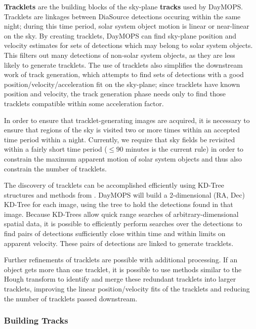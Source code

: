 \documentclass[12pt,preprint]{aastex}
\begin{document}
\textbf{Tracklets} are the building blocks of the sky-plane
\textbf{tracks} used by DayMOPS.  Tracklets are linkages between
DiaSource detections occuring within the same night; during this time
period, solar system object motion is linear or near-linear on the
sky. By creating tracklets, DayMOPS can find sky-plane position and
velocity estimates for sets of detections which may belong to solar
system objects.  This filters out many detections of non-solar system
objects, as they are less likely to generate tracklets.  The use of
tracklets also simplifies the downstream work of track generation,
which attempts to find sets of detections with a good
position/velocity/acceleration fit on the sky-plane; since tracklets
have known position and velocity, the track generation phase needs
only to find those tracklets compatible within some acceleration
factor.

In order to ensure that tracklet-generating images are acquired, it is
necessary to ensure that regions of the sky is visited two or more
times within an accepted time period within a night.  Currently, we
require that sky fields be revisited within a fairly short time period
($\leq 90$ minutes is the current rule) in order to constrain the
maximum apparent motion of solar system objects and thus also
constrain the number of tracklets.

The discovery of tracklets can be accomplished efficiently using
KD-Tree structures \citep{bentley_kdtrees} and methods from
\citet{kubica_thesis}.  DayMOPS will build a 2-dimensional (RA, Dec)
KD-Tree for each image, using the tree to hold the detections found in
that image.  Because KD-Trees allow quick range searches of
arbitrary-dimensional spatial data, it is possible to efficiently
perform searches over the detections to find pairs of detections
sufficiently close within time and within limits on apparent
velocity. These pairs of detections are linked to generate tracklets.


Further refinements of tracklets are possible with additional
processing. If an object gets more than one tracklet, it is possible
to use methods similar to the Hough transform to identify and merge
these redundant tracklets into larger tracklets, improving the linear
position/velocity fits of the tracklets and reducing the number of
tracklets passed downstream.

\subsubsection{Building Tracks}
\end{document}
